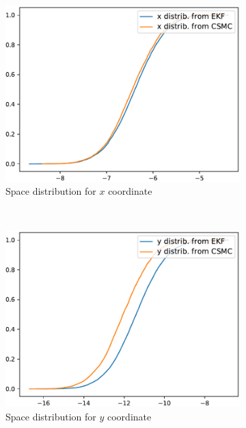 \documentclass[english, DIV=13]{scrartcl}
\begin{document}
\begin{figure}
    \centering
    \begin{subfigure}{0.49\textwidth}
        \includegraphics[width=\textwidth]{figures/distrib-x}
        \caption{Space distribution for $x$ coordinate} 
        \label{fig:distrib-x}
    \end{subfigure}%
    ~
    \begin{subfigure}{0.49\textwidth}
        \includegraphics[width=\textwidth]{figures/distrib-y}
        \caption{Space distribution for $y$ coordinate}
        \label{fig:distrib-y}
    \end{subfigure}%
    \\
    \begin{subfigure}{0.49\textwidth}

\end{subfigure}
\end{figure}
\end{document}
